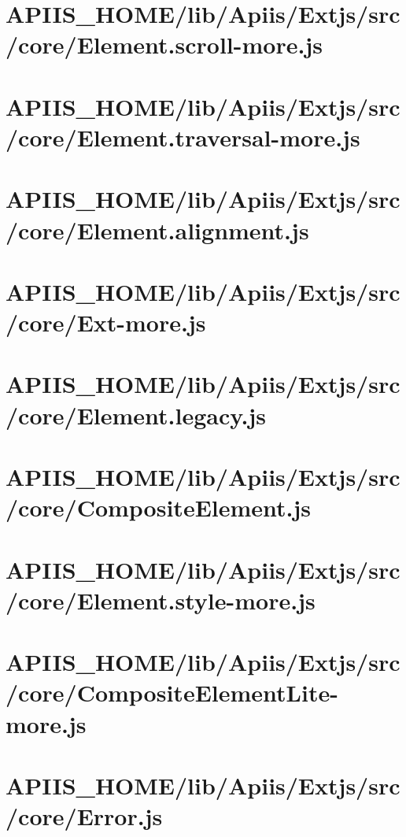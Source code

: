 \section{APIIS\_HOME/lib/Apiis/Extjs/src/core/Element.scroll-more.js} 
\section{APIIS\_HOME/lib/Apiis/Extjs/src/core/Element.traversal-more.js} 
\section{APIIS\_HOME/lib/Apiis/Extjs/src/core/Element.alignment.js} 
\section{APIIS\_HOME/lib/Apiis/Extjs/src/core/Ext-more.js} 
\section{APIIS\_HOME/lib/Apiis/Extjs/src/core/Element.legacy.js} 
\section{APIIS\_HOME/lib/Apiis/Extjs/src/core/CompositeElement.js} 
\section{APIIS\_HOME/lib/Apiis/Extjs/src/core/Element.style-more.js} 
\section{APIIS\_HOME/lib/Apiis/Extjs/src/core/CompositeElementLite-more.js} 
\section{APIIS\_HOME/lib/Apiis/Extjs/src/core/Error.js} 
